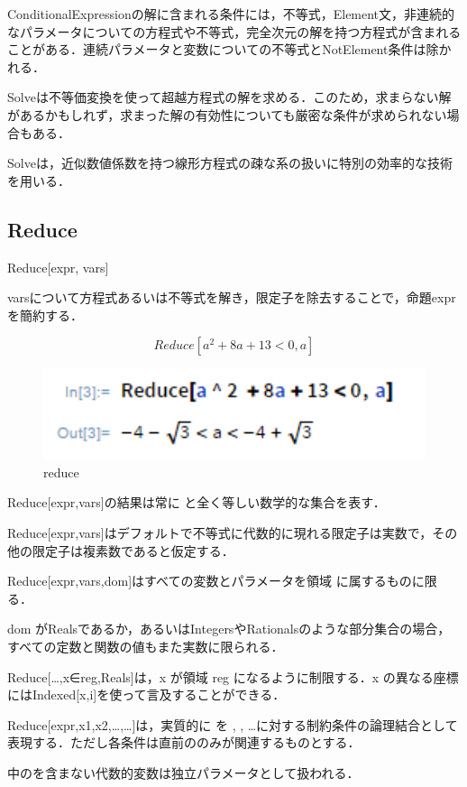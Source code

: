 ConditionalExpressionの解に含まれる条件には，不等式，Element文，非連続的なパラメータについての方程式や不等式，完全次元の解を持つ方程式が含まれることがある．連続パラメータと変数についての不等式とNotElement条件は除かれる．

Solveは不等価変換を使って超越方程式の解を求める．このため，求まらない解があるかもしれず，求まった解の有効性についても厳密な条件が求められない場合もある．

Solveは，近似数値係数を持つ線形方程式の疎な系の扱いに特別の効率的な技術を用いる．




\subsection {Reduce}

Reduce[expr, vars]

varsについて方程式あるいは不等式を解き，限定子を除去することで，命題exprを簡約する．

\[Reduce[a^2 +8a+13<0,a]\]

\begin{figure}[h]
\centering
\includegraphics[width=15cm]{reduce.png}
\caption{reduce}\label{図}
\end{figure}

Reduce[expr,vars]の結果は常に と全く等しい数学的な集合を表す．

Reduce[expr,vars]はデフォルトで不等式に代数的に現れる限定子は実数で，その他の限定子は複素数であると仮定する．

Reduce[expr,vars,dom]はすべての変数とパラメータを領域 に属するものに限る．

dom がRealsであるか，あるいはIntegersやRationalsのような部分集合の場合，すべての定数と関数の値もまた実数に限られる．


Reduce[…,x∈reg,Reals]は，x が領域 reg になるように制限する．x の異なる座標にはIndexed[x,i]を使って言及することができる．

Reduce[expr,{x1,x2,…},…]は，実質的に を , , …に対する制約条件の論理結合として表現する．ただし各条件は直前ののみが関連するものとする．

中のを含まない代数的変数は独立パラメータとして扱われる．

